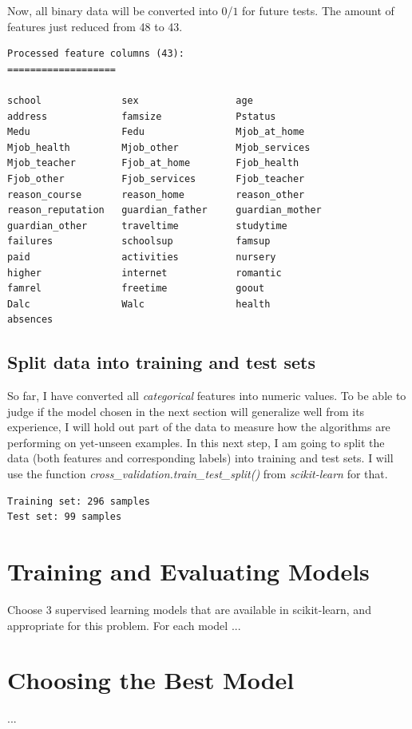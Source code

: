 \documentclass[a4paper]{article}
\begin{document}
Now, all binary data will be converted into $0$/$1$ for future tests. The amount of features just reduced from 48 to 43.

\begin{lstlisting}
Processed feature columns (43):
===================

school            	sex               	age               
address           	famsize           	Pstatus           
Medu              	Fedu              	Mjob_at_home      
Mjob_health       	Mjob_other        	Mjob_services     
Mjob_teacher      	Fjob_at_home      	Fjob_health       
Fjob_other        	Fjob_services     	Fjob_teacher      
reason_course     	reason_home       	reason_other      
reason_reputation 	guardian_father   	guardian_mother   
guardian_other    	traveltime        	studytime         
failures          	schoolsup         	famsup            
paid              	activities        	nursery           
higher            	internet          	romantic          
famrel            	freetime          	goout             
Dalc              	Walc              	health            
absences    
\end{lstlisting}

\subsection{Split data into training and test sets}
So far, I have converted all \textit{categorical} features into numeric values. To be able to judge if the model chosen in the next section will generalize well from its experience, I will hold out part of the data to measure how the algorithms are performing on yet-unseen examples. In this next step, I am going to split the data (both features and corresponding labels) into training and test sets. I will use the function \textit{cross\_validation.train\_test\_split()} from \textit{scikit-learn} for that.

\begin{lstlisting}
Training set: 296 samples
Test set: 99 samples
\end{lstlisting}


\section{Training and Evaluating Models}
Choose 3 supervised learning models that are available in scikit-learn, and appropriate for this problem. For each model ...


\section{Choosing the Best Model}
...
\end{document}
